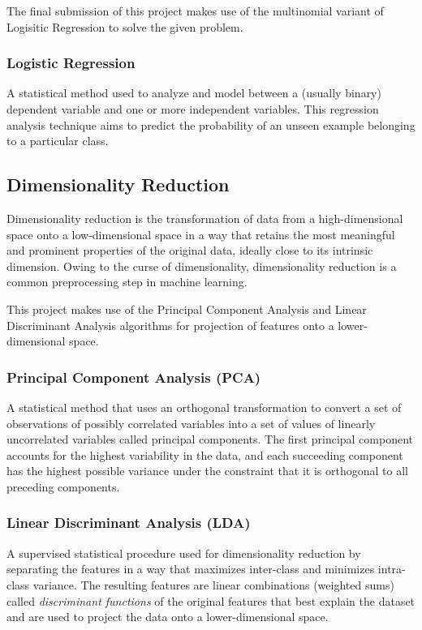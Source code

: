\documentclass[conference]{IEEEtran}
\begin{document}
    The final submission of this project makes use of the multinomial variant of Logisitic Regression to solve the given problem.
    \vspace*{3.0pt}

    \subsubsection{Logistic Regression}
    \label{sec:lr}
    A statistical method used to analyze and model between a (usually binary) dependent variable and one or more independent variables.
    This regression analysis technique aims to predict the probability of an unseen example belonging to a particular class.

    \subsection{Dimensionality Reduction}
    \label{sec:dimred}
    Dimensionality reduction is the transformation of data from a high-dimensional space onto a low-dimensional space in a way that
    retains the most meaningful and prominent properties of the original data, ideally close to its intrinsic dimension.
    Owing to the curse of dimensionality, dimensionality reduction is a common preprocessing step in machine learning.

    This project makes use of the Principal Component Analysis and Linear Discriminant Analysis algorithms for projection of features onto a lower-dimensional space.
    \vspace*{3.0pt}

    \subsubsection{Principal Component Analysis (PCA)}
    \label{sec:pca}
    A statistical method that uses an orthogonal transformation to convert a set of observations of possibly correlated variables
    into a set of values of linearly uncorrelated variables called principal components.
    The first principal component accounts for the highest variability in the data, and each succeeding component has the highest possible variance under the constraint
    that it is orthogonal to all preceding components.
    \vspace*{3.0pt}

    \subsubsection{Linear Discriminant Analysis (LDA)}
    \label{sec:lda}
    A supervised statistical procedure used for dimensionality reduction by separating the features in a way that maximizes inter-class and minimizes intra-class variance.
    The resulting features are linear combinations (weighted sums) called \textit{discriminant functions} of the original features that best explain the dataset and are used to
    project the data onto a lower-dimensional space.
\end{document}

